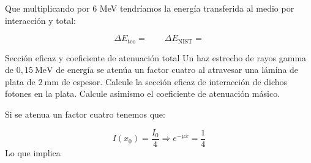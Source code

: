 \begingroup
\makeatletter
\let\old@floatboxreset\@floatboxreset
\def\@floatboxreset{\old@floatboxreset\centering} %
\makeatother

\endgroup


\begingroup
\makeatletter
\let\old@floatboxreset\@floatboxreset
\def\@floatboxreset{\old@floatboxreset\centering} %
\makeatother

\endgroup



\begingroup
\makeatletter
\let\old@floatboxreset\@floatboxreset
\def\@floatboxreset{\old@floatboxreset\centering} %
\makeatother

\endgroup



\begingroup
\makeatletter
\let\old@floatboxreset\@floatboxreset
\def\@floatboxreset{\old@floatboxreset\centering} %
\makeatother

\endgroup



Que multiplicando por $6$ MeV tendríamos la energía transferida al medio por interacción y total: 

\begin{equation}
    \Delta E_{\text{teo}} = \qquad \Delta E_{\text{NIST}} =  
\end{equation}



\begin{Ejercicio}{Sección eficaz y coeficiente de atenuación total} 
    Un haz estrecho de rayos gamma de $0,15\ \text{MeV}$ de energía se atenúa un factor cuatro al atravesar una lámina de plata de $2\ \text{mm}$ de espesor. Calcule la sección eficaz de interacción de dichos fotones en la plata. Calcule asimismo el coeficiente de atenuación másico.
\end{Ejercicio}

Si se atenua un factor cuatro tenemos que: 

\begin{equation}
    I(x_0) = \frac{I_0}{4} \Rightarrow e^{-\mu x} = \frac{1}{4}
\end{equation}
Lo que implica 

